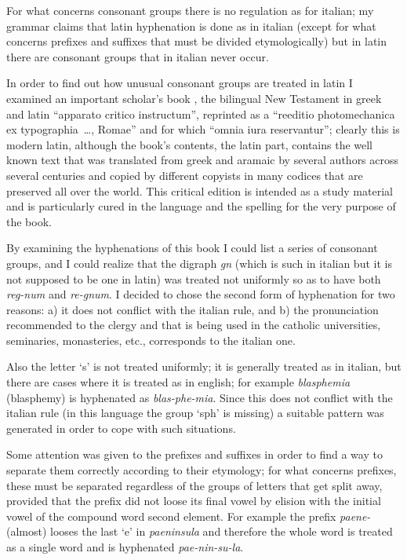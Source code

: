 \documentclass{ltugboat}
\begin{document}
For what concerns consonant groups there is no regulation as for italian; my
grammar \cite{manna} claims that latin hyphenation is  done  as  in  italian
(except  for  what  concerns  prefixes  and  suffixes  that  must be divided
etymologically) but in latin there are  consonant  groups  that  in  italian
never occur.

In  order  to  find  out how unusual consonant groups are treated in latin I
examined  an  important  scholar's  book  \cite{merk},  the  bilingual   New
Testament in greek and latin ``apparato critico instructum'', reprinted as a
``reeditio  photomechanica  ex  typographia~\dots,  Romae''  and  for  which
``omnia  iura  reservantur'';  clearly  this  is  modern latin, although the
book's contents, the latin part, contains  the  well  known  text  that  was
translated  from  greek  and  aramaic  by  several  authors  across  several
centuries and  copied  by  different  copyists  in  many  codices  that  are
preserved  all  over the world. This critical edition is intended as a study
material and is particularly cured in the language and the spelling for  the
very purpose of the book.

By  examining  the  hyphenations  of  this  book  I  could  list a series of
consonant groups, and I could realize that the digraph {\it  gn}  (which  is
such  in  italian but it is not supposed to be one in latin) was treated not
uniformly so as to have both {\it reg-num} and {\it re-gnum}. I  decided  to
chose  the  second  form  of  hyphenation  for  two  reasons: a) it does not
conflict with the italian rule, and b) the pronunciation recommended to  the
clergy  and  that  is  being  used in the catholic universities, seminaries,
monasteries, etc., corresponds to the italian one.

Also  the letter `s' is not treated uniformly; it is generally treated as in
italian, but there are cases where it is treated as in english; for  example
{\it blasphemia} (blasphemy) is hyphenated as {\it blas-phe-mia}. Since this
does not conflict with the italian rule (in this language the group `sph' is
missing)  a  suitable  pattern  was  generated  in  order  to cope with such
situations.


Some attention was given to the prefixes and suffixes in order to find a way
to separate them correctly according to their etymology; for  what  concerns
prefixes,  these  must be separated regardless of the groups of letters that
get split away, provided that the prefix did not loose its  final  vowel  by
elision  with  the  initial  vowel  of the compound word second element. For
example the prefix {\it  paene-}  (almost)  looses  the  last  `e'  in  {\it
paeninsula}  and therefore the whole word is treated as a single word and is
hyphenated {\it pae-nin-su-la}.
\end{document}
